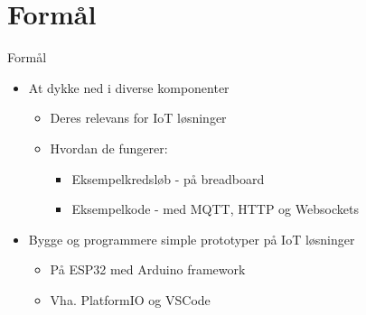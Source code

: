 \documentclass[aspectratio=169]{beamer}
\begin{document}
\section{Formål}
\begin{frame}{Formål}
	\begin{textBox}
		\begin{itemize}
			\item At dykke ned i diverse komponenter
			\begin{itemize}
				\item Deres relevans for IoT løsninger
				\item Hvordan de fungerer:
				\begin{itemize}
					\item Eksempelkredsløb - på breadboard
					\item Eksempelkode - med MQTT, HTTP og Websockets
				\end{itemize}
			\end{itemize}
			\item Bygge og programmere simple prototyper på IoT løsninger
			\begin{itemize}
				\item På ESP32 med Arduino framework
				\item Vha. PlatformIO og VSCode
			\end{itemize}
		\end{itemize}
	\end{textBox}
\end{frame}
\end{document}

